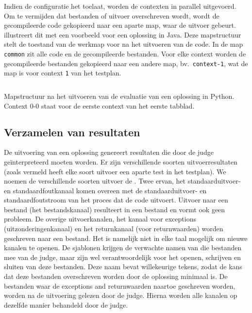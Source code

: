 Indien de configuratie het toelaat, worden de contexten in parallel uitgevoerd.
Om te vermijden dat bestanden of uitvoer overschreven wordt, wordt de gecompileerde code gekopieerd naar een aparte map, waar de uitvoer gebeurt.
 illustreert dit met een voorbeeld voor een oplossing in Java.
Deze mapstructuur stelt de toestand van de werkmap voor na het uitvoeren van de code.
In de map \texttt{common} zit alle code en de gecompileerde bestanden.
Voor elke context worden de gecompileerde bestanden gekopieerd naar een andere map, bv.\ \texttt{context-1}, wat de map is voor context \texttt{1} van het testplan.

\begin{listing}
    \inputminted{text}{code/dir-listing.txt}
    \caption{Mapstructuur na het uitvoeren van de evaluatie van een oplossing in Python.
    Context 0-0 staat voor de eerste context van het eerste tabblad.}
    \label{lst:mapstructuur}
\end{listing}

\subsection{Verzamelen van resultaten}\label{subsec:verzamelen-van-resultaten}

De uitvoering van een oplossing genereert resultaten die door de judge geïnterpreteerd moeten worden.
Er zijn verschillende soorten uitvoerresultaten (zoals vermeld heeft elke soort uitvoer een aparte test in het testplan).
We noemen de verschillende soorten uitvoer de .
Twee ervan, het standaarduitvoer- en standaardfoutkanaal komen overeen met de standaarduitvoer- en standaardfoutstroom van het proces dat de code uitvoert.
Uitvoer naar een bestand (het bestandskanaal) resulteert in een bestand en vormt ook geen probleem.
De overige uitvoerkanalen, het kanaal voor exceptions (uitzonderingenkanaal) en het returnkanaal (voor returnwaarden) worden geschreven naar een bestand.
Het is namelijk niet in elke taal mogelijk om nieuwe kanalen te openen.
De sjablonen krijgen de verwachte namen van die bestanden mee van de judge, maar zijn wel verantwoordelijk voor het openen, schrijven en sluiten van deze bestanden.
Deze naam bevat willekeurige tekens, zodat de kans dat deze bestanden overschreven worden door de oplossing minimaal is.
De bestanden waar de exceptions and returnwaarden naartoe geschreven worden, worden na de uitvoering gelezen door de judge.
Hierna worden alle kanalen op dezelfde manier behandeld door de judge.


